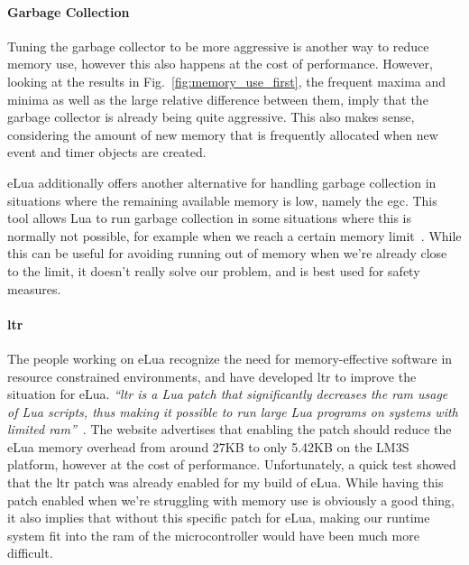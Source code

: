 \paragraph{Garbage Collection} Tuning the garbage collector to be more aggressive is another way to reduce memory use, however this also happens at the cost of performance. However, looking at the results in Fig.~\ref{fig:memory_use_first}, the frequent maxima and minima as well as the large relative difference between them, imply that the garbage collector is already being quite aggressive. This also makes sense, considering the amount of new memory that is frequently allocated when new event and timer objects are created.

eLua additionally offers another alternative for handling garbage collection in situations where the remaining available memory is low, namely the \gls{egc}. This tool allows Lua to run garbage collection in some situations where this is normally not possible, for example when we reach a certain memory limit~\cite{website:elua_egc}. While this can be useful for avoiding running out of memory when we're already close to the limit, it doesn't really solve our problem, and is best used for safety measures.

\paragraph{\gls{ltr}} The people working on eLua recognize the need for memory-effective software in resource constrained environments, and have developed \gls{ltr} to improve the situation for eLua. \emph{``\gls{ltr} is a Lua patch that significantly decreases the \gls{ram} usage of Lua scripts, thus making it possible to run large Lua programs on systems with limited \gls{ram}''}~\cite{website:elua_ltr}. The website advertises that enabling the patch should reduce the eLua memory overhead from around 27KB to only 5.42KB on the LM3S platform, however at the cost of performance. Unfortunately, a quick test showed that the \gls{ltr} patch was already enabled for my build of eLua. While having this patch enabled when we're struggling with memory use is obviously a good thing, it also implies that without this specific patch for eLua, making our runtime system fit into the \gls{ram} of the microcontroller would have been much more difficult.

